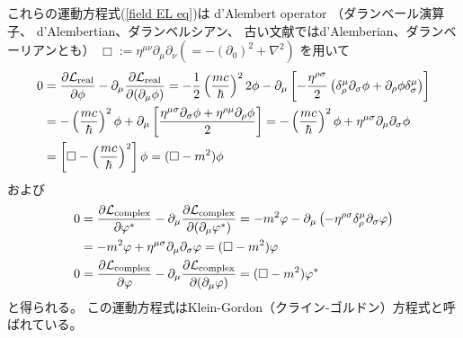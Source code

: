 これらの運動方程式(\ref{field EL eq})は
d'Alembert operator
（ダランベール演算子、
d'Alembertian、ダランベルシアン、
古い文献ではd'Alemberian、ダランベーリアンとも）
$\Box := \eta^{\mu \nu}
    \partial_\mu
    \partial_\nu
(= - (\partial_0)^2 + \nabla^2)$
を用いて
\begin{align}
    0 &=
    \dfrac{\partial \mathcal{L}_{\text{real}}}
        {\partial \phi}
    -
    \partial_\mu
    \dfrac{\partial \mathcal{L}_{\text{real}}}
        {\partial (\partial_\mu \phi)}
    =
    - \dfrac{1}{2}
    \left(
        \dfrac{m c}{\hbar}
    \right)^2
    2 \phi
    -
    \partial_\mu
    \left[
        -
        \dfrac{ \eta^{\rho \sigma} }{2}
        \left(
            \delta_\rho^\mu
            \partial_\sigma \phi
        +
            \partial_\rho \phi
            \delta_\sigma^\mu
        \right)
    \right]
\notag\\&
    =
    - \left(
        \dfrac{m c}{\hbar}
    \right)^2 \phi
    +
    \partial_\mu
    \left[
        \dfrac{
            \eta^{\mu \sigma}
            \partial_\sigma \phi
        +
            \eta^{\rho \mu}
            \partial_\rho \phi
        }{2}
    \right]
    =
    - \left(
        \dfrac{m c}{\hbar}
    \right)^2 \phi
    +
    \eta^{\mu \sigma}
        \partial_\mu
        \partial_\sigma
    \phi
\notag\\&
    =
    \left[\Box
    - \left(
        \dfrac{m c}{\hbar}
    \right)^2
    \right] \phi
=
    (\Box - m^2) \phi
\label{free real scalar eom}
\end{align}
および
\begin{subequations}
\begin{align}
    0 &=
    \dfrac{\partial \mathcal{L}_{\text{complex}}}
        {\partial \varphi^*}
    -
    \partial_\mu
    \dfrac{\partial \mathcal{L}_{\text{complex}}}
        {\partial (\partial_\mu \varphi^*)}
    =
    -
    m^2 \varphi
    -
    \partial_\mu
    \left(
        -
        \eta^{\rho\sigma}
        \delta_\rho^\mu
        \partial_\sigma \varphi        
    \right)
\notag\\&
    =
    -
    m^2 \varphi
    +
    \eta^{\mu\sigma}
        \partial_\mu
        \partial_\sigma
        \varphi
    =
    (\Box - m^2)
    \varphi
\\
    0 &=
    \dfrac{\partial \mathcal{L}_{\text{complex}}}
        {\partial \varphi}
    -
    \partial_\mu
    \dfrac{\partial \mathcal{L}_{\text{complex}}}
        {\partial (\partial_\mu \varphi)}
    =
    (\Box - m^2)
    \varphi^*
\end{align}
\label{free complex scalar eom}
\end{subequations}
と得られる。
この運動方程式はKlein-Gordon（クライン-ゴルドン）方程式と呼ばれている。

